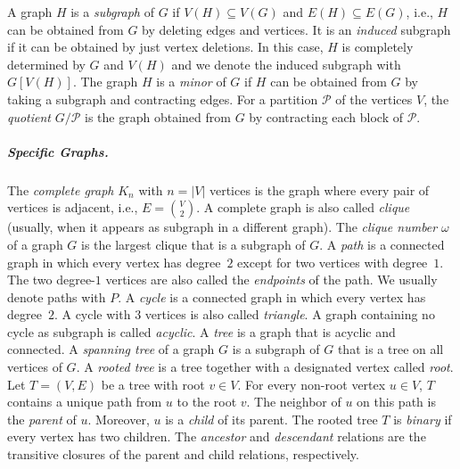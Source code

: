 \documentclass[11pt]{article}
\begin{document}
A graph $H$ is a \emph{subgraph} of $G$ if $V(H) \subseteq V(G)$ and $E(H) \subseteq E(G)$, i.e., $H$ can be obtained from $G$ by deleting edges and vertices.
It is an \emph{induced} subgraph if it can be obtained by just vertex deletions.
In this case, $H$ is completely determined by $G$ and $V(H)$ and we denote the induced subgraph with $G[V(H)]$.
The graph $H$ is a \emph{minor} of $G$ if $H$ can be obtained from $G$ by taking a subgraph and contracting edges.
For a partition $\mathcal P$ of the vertices $V$, the \emph{quotient} $G / \mathcal P$ is the graph obtained from $G$ by contracting each block of $\mathcal P$.
%
%
\subparagraph{Specific Graphs.}
%
The \emph{complete graph} $K_n$ with $n = |V|$ vertices is the graph where every pair of vertices is adjacent, i.e., $E = \binom{V}{2}$.
A complete graph is also called \emph{clique} (usually, when it appears as subgraph in a different graph).
The \emph{clique number} $\omega$ of a graph $G$ is the largest clique that is a subgraph of $G$.
%
A \emph{path} is a connected graph in which every vertex has degree~$2$ except for two vertices with degree~$1$.
The two degree-$1$ vertices are also called the \emph{endpoints} of the path.
We usually denote paths with $P$.
A \emph{cycle} is a connected graph in which every vertex has degree~$2$.
A cycle with $3$ vertices is also called \emph{triangle}.
A graph containing no cycle as subgraph is called \emph{acyclic}.
A \emph{tree} is a graph that is acyclic and connected.
A \emph{spanning tree} of a graph $G$ is a subgraph of $G$ that is a tree on all vertices of $G$.
A \emph{rooted tree} is a tree together with a designated vertex called \emph{root}.
Let $T = (V, E)$ be a tree with root $v \in V$.
For every non-root vertex $u \in V$, $T$ contains a unique path from $u$ to the root $v$.
The neighbor of $u$ on this path is the \emph{parent} of $u$.
Moreover, $u$ is a \emph{child} of its parent.
The rooted tree $T$ is \emph{binary} if every vertex has two children.
The \emph{ancestor} and \emph{descendant} relations are the transitive closures of the parent and child relations, respectively.
%
%
%
\end{document}
